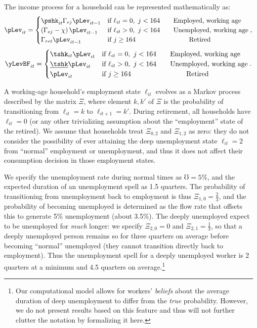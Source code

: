 \documentclass[./ConsumptionResponse]{subfiles}
\begin{document}
The income process for a household can be represented mathematically as:
\begin{equation*}
  \pLev_{it} = \begin{cases}
    \pshk_{it} \Gamma_{ej} \pLev_{it-1} & \text{if } \ell_{it} = 0,~ j < 164 \qquad\text{Employed, working age}\\
    (\Gamma_{ej} - \chi)\, \pLev_{it-1} & \text{if } \ell_{it} > 0,~ j < 164 \qquad\text{Unemployed, working age}\\
    \Gamma_{ret} \pLev_{it-1} & \text{if } j \geq 164 \qquad \qquad \qquad \qquad \text{Retired}
  \end{cases},
\end{equation*}
\begin{equation*}
  \yLevBF_{it} = \begin{cases}
    \tshk_{it} \pLev_{it} & \text{if } \ell_{it} = 0,~ j < 164 \qquad\text{Employed, working age}\\
    \underline{\tshk} \pLev_{it} & \text{if } \ell_{it} > 0,~ j < 164 \qquad\text{Unemployed, working age}\\
    \pLev_{it} & \text{if } j \geq 164 \qquad \qquad \qquad \qquad \text{Retired}
  \end{cases}.
\end{equation*}


A working-age household's employment state $\ell_{it}$ evolves as a Markov process described by the matrix $\Xi$, where element $k,k'$ of $\Xi$ is the probability of transitioning from $\ell_{it} = k$ to $\ell_{it+1} = k'$.  During retirement, all households have $\ell_{it}=0$ (or any other trivializing assumption about the ``employment'' state of the retired).
We assume that households treat $\Xi_{0,2}$ and $\Xi_{1,2}$ as zero: they do not consider the possibility of ever attaining the deep unemployment state $\ell_{it}=2$ from ``normal'' employment or unemployment, and thus it does not affect their consumption decision in those employment states.

We specify the unemployment rate during normal times as $\mho = 5\%$, and the expected duration of an unemployment spell as 1.5 quarters.
The probability of transitioning from unemployment back to employment is thus $\Xi_{1,0} = \frac{2}{3}$, and the probability of becoming unemployed is determined as the flow rate that offsets this to generate 5\% unemployment (about 3.5\%).
The deeply unemployed expect to be unemployed for \textit{much} longer: we specify $\Xi_{2,0} = 0$ and $\Xi_{2,1} = \frac{1}{3}$, so that a deeply unemployed person remains so for three quarters on average before becoming ``normal'' unemployed (they cannot transition directly back to employment).
Thus the unemployment spell for a deeply unemployed worker is 2 quarters at a minimum and 4.5 quarters on average.\footnote{Our computational model allows for workers' \textit{beliefs} about the average duration of deep unemployment to differ from the \textit{true} probability.  However, we do not present results based on this feature and thus will not further clutter the notation by formalizing it here.}
\end{document}
